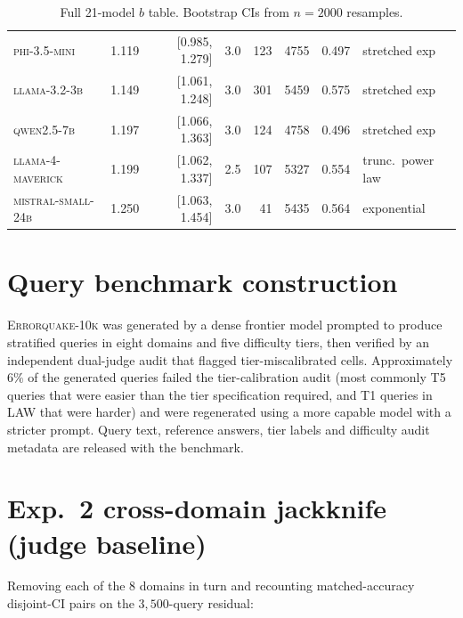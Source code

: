 \documentclass{article}
\newcommand{\sdi}{\ensuremath{b}}
\begin{document}
\begin{table}[h]
{\begin{tabular}{l r r l r r r l}
\textsc{phi-3.5-mini}            & 1.119 & [0.985, 1.279] & 3.0 &  123 & 4755 & 0.497 & stretched exp \\
\textsc{llama-3.2-3b}            & 1.149 & [1.061, 1.248] & 3.0 &  301 & 5459 & 0.575 & stretched exp \\
\textsc{qwen2.5-7b}              & 1.197 & [1.066, 1.363] & 3.0 &  124 & 4758 & 0.496 & stretched exp \\
\textsc{llama-4-maverick}        & 1.199 & [1.062, 1.337] & 2.5 &  107 & 5327 & 0.554 & trunc.\ power law \\
\textsc{mistral-small-24b}       & 1.250 & [1.063, 1.454] & 3.0 &   41 & 5435 & 0.564 & exponential \\
\bottomrule
\end{tabular}
}
\caption{Full 21-model \sdi{} table. Bootstrap CIs from $n=2000$
resamples.}\label{tab:full21}
\end{table}

\section{Query benchmark construction}\label{app:benchmark}

\textsc{Errorquake-10k} was generated by a dense frontier model
prompted to produce stratified queries in eight domains and five
difficulty tiers, then verified by an independent dual-judge audit
that flagged tier-miscalibrated cells. Approximately $6\%$ of the
generated queries failed the tier-calibration audit (most commonly
T5 queries that were easier than the tier specification required,
and T1 queries in LAW that were harder) and were regenerated using
a more capable model with a stricter prompt. Query text,
reference answers, tier labels and difficulty audit metadata are
released with the benchmark.

\section{Exp.~2 cross-domain jackknife (judge baseline)}\label{app:jackknife}

Removing each of the $8$ domains in turn and recounting
matched-accuracy disjoint-CI pairs on the $3{,}500$-query residual:
\end{document}
